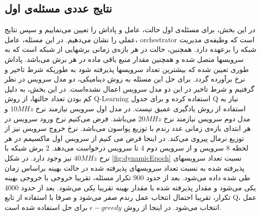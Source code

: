 \subsection{نتایج عددی مسئله‌ی اول}
در این بخش، برای مسئله‌ی اول حالت، عامل و پاداش را تعیین می‌نماییم و سپس نتایج عملی را نشان می‌دهیم.
در این مسئله، عامل، orchestrator است که وظیفه‌ی مدیریت شبکه را برعهده دارد.
همچنین، حالت در هر بازه‌ی زمانی برشهایی از شبکه است که به سرویسها متصل شده و همچنین مقدار منبع باقی ماده در هر برش می‌باشد. 
پاداش طوری تعیین شده که بیشترین تعداد سرویسها پذیرفته شود به طوریکه شرط تاخیر و نرخ برآورده گردد.
برای حل این مسئله به روش دینامیکی، دو مدل سرویس در نظر گرفتیم و شرط تاخیر در این دو مدل سرویس اعمال نشده‌است.
در این بخش، به دلیل کم بودن تعداد حالتها، از روش Q-Learning استفاده کرده و برای جدول Q نیاز به استفاده از روش یادگیری عمیق نیست.
در مدل اول سرویس نیازمند نرخ $10MHz$ و مدل دوم سرویس نیازمند نرخ $20MHz$
می‌باشد. فرض می‌کنیم نرخ ورود سرویس در هر ابتدای بازه‌ی زمانی عدد رندم با توزیع پواسون می‌باشد. نرخ خروج سرویس نیز از توزیع نرمال پیروی می‌کند. در اینجا فرض می کنیم از  سرویس اول ماکسیمم در هر لحظه 8 سرویس و از سرویس دوم 4 تا سرویس درخواست می‌دهد. 2 برش شبکه با نرخ $40MHz$ نیز وجود دارد. 
در شکل \ref{fig:dynamicEpoch}
نسبت تعداد سرویسهای پذیرفته شده به نسبت تعداد سرویسهای پذیرفته شده در حالت بهینه براساس زمان طی شده داده می‌شود. بعد از حدود 900 تکرار مسئله، تقریبا خروجی با خروجی بهینه یکی می‌شود و مقدار پذیرفته شده با مقدار بهینه تقریبا یکی می‌شود. بعد از حدود 4000 تکرار، تقریبا احتمال انتخاب عمل رندم صفر می‌شود و صرفا با استفاده از تابع Q، عمل انتخاب می‌شود.
در اینجا از روش 
$\epsilon-greedy$
برای حل استفاده شده است.

